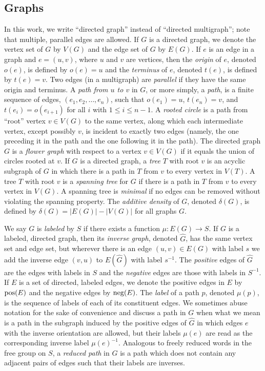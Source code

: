 \documentclass{article}
\newcommand{\pos}{\textnormal{pos}}
\newcommand{\nega}{\textnormal{neg}}
\begin{document}
\subsection{Graphs}

In this work, we write ``directed graph'' instead of ``directed multigraph''; note that multiple, parallel edges are allowed.
If $G$ is a directed graph, we denote the vertex set of $G$ by $V(G)$ and the edge set of $G$ by $E(G)$.
If $e$ is an edge in a graph and $e = (u, v)$, where $u$ and $v$ are vertices, then the \emph{origin} of $e$, denoted $o(e)$, is defined by $o(e) = u$ and the \emph{terminus} of $e$, denoted $t(e)$, is defined by $t(e) = v$.
Two edges (in a multigraph) are \emph{parallel} if they have the same origin and terminus.
A \emph{path from $u$ to $v$} in $G$, or more simply, a \emph{path}, is a finite sequence of edges, $(e_1, e_2, \dotsc, e_n)$, such that $o(e_1) = u$, $t(e_n) = v$, and $t(e_i) = o(e_{i + 1})$ for all $i$ with $1 \leq i \leq n - 1$.
A \emph{rooted circle} is a path from ``root'' vertex $v \in V(G)$ to the same vertex, along which each intermediate vertex, except possibly $v$, is incident to exactly two edges (namely, the one preceding it in the path and the one following it in the path).
The directed graph $G$ is a \emph{flower graph} with respect to a vertex $v \in V(G)$ if it equals the union of circles rooted at $v$.
If $G$ is a directed graph, a \emph{tree} $T$ with root $v$ is an acyclic subgraph of $G$ in which there is a path in $T$ from $v$ to every vertex in $V(T)$.
A tree $T$ with root $v$ is a \emph{spanning tree} for $G$ if there is a path in $T$ from $v$ to every vertex in $V(G)$.
A spanning tree is \emph{minimal} if no edges can be removed without violating the spanning property.
The \emph{additive density} of $G$, denoted $\delta(G)$, is defined by $\delta(G) = |E(G)| - |V(G)|$ for all graphs $G$.

We say $G$ is \emph{labeled} by $S$ if there exists a function $\mu \colon E(G) \to S$.
If $G$ is a labeled, directed graph, then its \emph{inverse graph}, denoted $\hat{G}$, has the same vertex set and edge set, but wherever there is an edge $(u, v) \in E(G)$ with label $s$ we add the inverse edge $(v, u)$ to $E(\hat{G})$ with label $s^{-1}$.
The \emph{positive} edges of $\hat{G}$ are the edges with labels in $S$ and the \emph{negative} edges are those with labels in $S^{-1}$.
If $E$ is a set of directed, labeled edges, we denote the positive edges in $E$ by $\pos(E)$ and the negative edges by $\nega(E)$.
The \emph{label} of a path $p$, denoted $\mu(p)$, is the sequence of labels of each of its constituent edges.
We sometimes abuse notation for the sake of convenience and discuss a path in $G$ when what we mean is a path in the subgraph induced by the positive edges of $\hat{G}$ in which edges $e$ with the inverse orientation are allowed, but their labels $\mu(e)$ are read as the corresponding inverse label $\mu(e)^{-1}$.
Analogous to freely reduced words in the free group on $S$, a \emph{reduced path} in $G$ is a path which does not contain any adjacent pairs of edges such that their labels are inverses.
\end{document}
